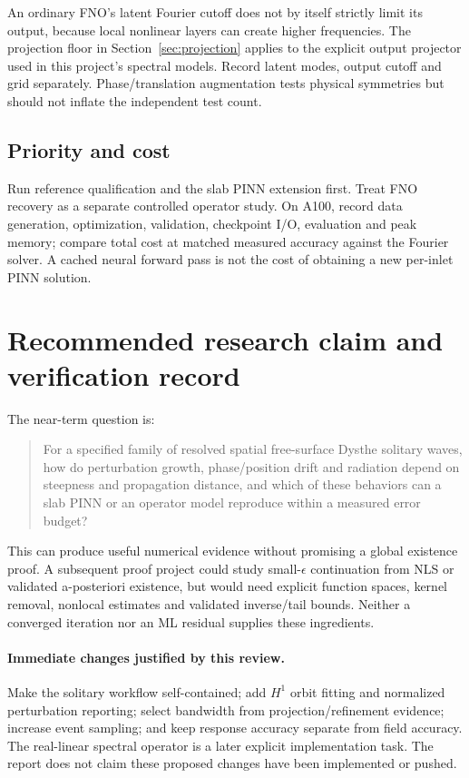 \documentclass[11pt]{article}
\begin{document}
An ordinary FNO's latent Fourier cutoff does not by itself strictly limit its
output, because local nonlinear layers can create higher frequencies. The
projection floor in Section~\ref{sec:projection} applies to the explicit output projector used in
this project's spectral models. Record latent modes, output cutoff and grid
separately. Phase/translation augmentation tests physical symmetries but should
not inflate the independent test count.

\subsection{Priority and cost}
Run reference qualification and the slab PINN extension first. Treat FNO recovery
as a separate controlled operator study. On A100, record data generation,
optimization, validation, checkpoint I/O, evaluation and peak memory; compare
total cost at matched measured accuracy against the Fourier solver. A cached
neural forward pass is not the cost of obtaining a new per-inlet PINN solution.

\newpage
\section{Recommended research claim and verification record}
The near-term question is:
\begin{quote}
For a specified family of resolved spatial free-surface Dysthe solitary waves,
how do perturbation growth, phase/position drift and radiation depend on
steepness and propagation distance, and which of these behaviors can a slab
PINN or an operator model reproduce within a measured error budget?
\end{quote}
This can produce useful numerical evidence without promising a global existence
proof. A subsequent proof project could study small-$\epsilon$ continuation
from NLS or validated a-posteriori existence, but would need explicit function
spaces, kernel removal, nonlocal estimates and validated inverse/tail bounds.
Neither a converged iteration nor an ML residual supplies these ingredients.

\paragraph{Immediate changes justified by this review.}
Make the solitary workflow self-contained; add $H^1$ orbit fitting and normalized
perturbation reporting; select bandwidth from projection/refinement evidence;
increase event sampling; and keep response accuracy separate from field accuracy.
The real-linear spectral operator is a later explicit implementation task.
The report does not claim these proposed changes have been implemented or pushed.
\end{document}
